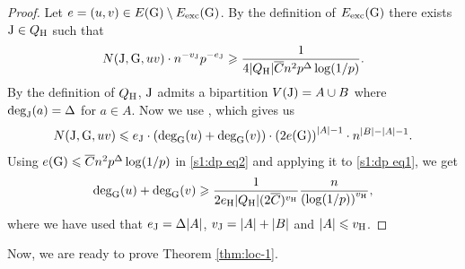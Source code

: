 \documentclass[a4paper,11pt,english,reqno]{amsart}
\numberwithin{equation}{section}
\renewcommand{\leq}{\leqslant}
\renewcommand{\geq}{\geqslant}
\newcommand{\cbar}{\overline{C}}
\newcommand{\uH}{\textup{H}}
\newcommand{\tu}[1]{\textup{#1}}
\begin{document}
		\begin{proof}Let $e=(u,v)\in E(\tu{G})\setminus E_{\text{exc}}(\tu{G})$.
			By the definition of $E_{\text{exc}}(\tu{G})$  there exists $ \tu{J}\in Q_{\uH}$ such that
			\begin{equation}
				\label{s1:dp eq1}
				N(\tu{J}, \tu{G}, uv)\cdot n^{-v_{\tu{J}}}p^{-e_{\tu{J}}}\geq %
				\frac{1}{4 |Q_{\uH}| \cbar n^{2}p^{\Delta}\log(1/p)}.
			\end{equation}
			By the definition of $Q_{\uH}$, $\tu{J}$ admits a bipartition $V(\tu{J})=A\cup B$ where $\text{deg}_{\tu{J}}(a) = \Delta$ for $a\in A$.
			Now we use \cite[Lemma~5.8]{HMS}, which gives us
			\begin{equation}
				\label{s1:dp eq2}
				N(\tu{J}, \tu{G},uv)\leq e_{\tu{J}}\cdot \left(\text{deg}_{\tu{G}}(u)+\text{deg}_{\tu{G}}(v)\right)\cdot \left(2e(\tu{G})\right)^{|A|-1}\cdot n^{|B|-|A|-1}.
			\end{equation}
			Using $e(\tu{G})\leq \cbar n^{2}p^{\Delta}\log(1/p)$ in \eqref{s1:dp eq2} and applying it to \eqref{s1:dp eq1}, we get
			\begin{equation*}
				\text{deg}_{\tu{G}}(u)+\text{deg}_{\tu{G}}(v) \geq \frac{1}{2e_{\uH}|Q_{\uH}|(2\cbar)^{v_{\uH}}}\frac{n}{\left(\log(1/p)\right)^{v_{\uH}}}, 
			\end{equation*}
			where we have used that $e_{\tu{J}} = \Delta |A|$, $v_{\tu{J}} = |A|+|B|$ and $|A|\leq v_{\uH}$.
		\end{proof}
		Now, we are ready to prove Theorem \ref{thm:loc-1}. 
\end{document}
